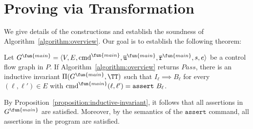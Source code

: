 
\chapter{Proving via Transformation}
\label{ch:proving-via-transformation}

We give details of the constructions and establish the soundness of
Algorithm~\ref{algorithm:overview}. Our goal is to establish the
following theorem:

\begin{theorem}
  Let $G^\fun{main} = \langle V, E, \textmd{cmd}^\fun{main} , \overline{\mathtt{u}}^\fun{main}, \overline{\mathtt{r}}^\fun{main},s,e \rangle$ be a control flow
  graph in $P$. If Algorithm~\ref{algorithm:overview} returns
  $\mathit{Pass}$, there is an inductive invariant $\Pi (G^\fun{main}, \TT)$
  such that $I_{\ell} \implies B_{\ell}$ for every $(\ell, \ell') \in
  E$ with $\textmd{cmd}^\fun{main} (\ell, \ell') = \mathtt{assert\ } B_{\ell}$.
  \label{theorem:soundness}
\end{theorem}
By Proposition~\ref{proposition:inductive-invariant}, it follows that
all assertions in $G^\fun{main}$ are satisfied.
Moreover, by the semantics of the 
$\mathtt{assert}$ command, all assertions in the program are satisfied.






